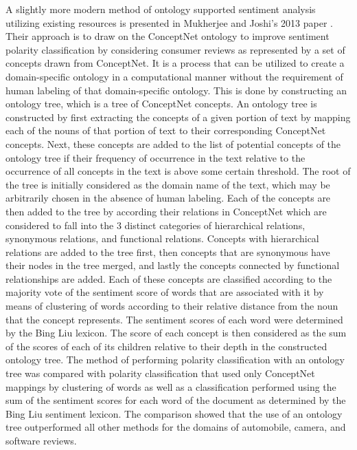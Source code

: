 \documentclass[letterpaper, 10 pt, conference]{ieeeconf}
\begin{document}
A slightly more modern method of ontology supported sentiment analysis utilizing existing resources is presented in Mukherjee and Joshi's 2013 paper \textcolor{gray}{\cite{Mukherjee}}. Their approach is to draw on the ConceptNet ontology to improve sentiment polarity classification by considering consumer reviews as represented by a set of concepts drawn from ConceptNet. It is a process that can be utilized to create a domain-specific ontology in a computational manner without the requirement of human labeling of that domain-specific ontology. This is done by constructing an ontology tree, which is a tree of ConceptNet concepts. An ontology tree is constructed by first extracting the concepts of a given portion of text by mapping each of the nouns of that portion of text to their corresponding ConceptNet concepts. Next, these concepts are added to the list of potential concepts of the ontology tree if their frequency of occurrence in the text relative to the occurrence of all concepts in the text is above some certain threshold. The root of the tree is initially considered as the domain name of the text, which may be arbitrarily chosen in the absence of human labeling. Each of the concepts are then added to the tree by according their relations in ConceptNet which are considered to fall into the 3 distinct categories of hierarchical relations, synonymous relations, and functional relations. Concepts with hierarchical relations are added to the tree first, then concepts that are synonymous have their nodes in the tree merged, and lastly the concepts connected by functional relationships are added. Each of these concepts are classified according to the majority vote of the sentiment score of words that are associated with it by means of clustering of words according to their relative distance from the noun that the concept represents. The sentiment scores of each word were determined by the Bing Liu lexicon. The score of each concept is then considered as the sum of the scores of each of its children relative to their depth in the constructed ontology tree. The method of performing polarity classification with an ontology tree was compared with polarity classification that used only ConceptNet mappings by clustering of words as well as a classification performed using the sum of the sentiment scores for each word of the document as determined by the Bing Liu sentiment lexicon. The comparison showed that the use of an ontology tree outperformed all other methods for the domains of automobile, camera, and software reviews.
\end{document}
